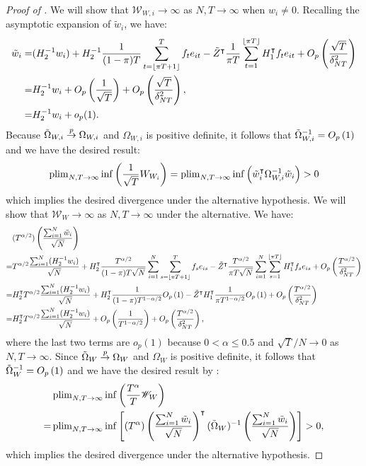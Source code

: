 \documentclass[12pt]{article}
\newcommand*{\tran}{\intercal}
\theoremstyle{plain}
\numberwithin{equation}{section}
\begin{document}
\begin{proof}[Proof of ]
We will show that $\mathscr{W}_{W, i} \to \infty$ as $N, T \to \infty$ when $w_i \neq 0$.
Recalling the asymptotic expansion of $\tilde{w}_i$, we have:
\begin{align*}
\tilde{w}_i = &(H_{2}^{-1} w_i) +
H_{2}^{-1} \frac{1}{(1 - \pi){T}} \sumTfloort f_t e_{it} - 
\tilde{Z}^\tran \frac{1}{\pi {T}} \sumTfloor H_1^\tran f_t e_{it} +
\OprtTdeltasq  \\
= &H_2^{-1} w_i + \OprtT + \OprtTdeltasq, \\
= &H_2^{-1} w_i + o_p(1).
\end{align*}
Because $\tilde{\Omega}_{W, i} \overset{p}{\to} \Omega_{W, i}$ and $\Omega_{W, i}$ is positive definite, it follows that $\tilde{\Omega}_{W, i}^{-1} = O_p \left( 1 \right)$ and we have the desired result:
\begin{align*}
\plimNT \inf \left( 
	\frac{1}{\sqrt{T}} W_{W_i}
\right) = \plimNT \inf \left( 
	\tilde{w}_i^\tran \Omega_{W, i}^{-1} \tilde{w}_i
\right) > 0
\end{align*}
which implies the desired divergence under the alternative hypothesis.
We will show that $\mathscr{W}_W \to \infty$ as $N, T \to \infty$ under the alternative. We have:
\begin{align*}
&(T^{\alpha / 2}) \left( \frac{\sumN \tilde{w}_i}{\sqrt{N}}\right) \\
= &T^{\alpha / 2} \frac{\sumN (H_{2}^{-1} w_i)}{\sqrt{N}} + 
H_{2}^\tran \frac{T^{\alpha / 2}}{(1 - \pi) T \sqrt{N}} \sumN \sumTfloorts f_s e_{is} - 
\tilde{Z}^\tran \frac{T^{\alpha / 2}}{\pi T \sqrt{N}} \sumN \sumTfloors H_1^\tran f_s e_{is} +
\Op{\frac{T^{\alpha/2}}{\delta_{NT}^2}}
\\
= &H_2^\tran T^{\alpha / 2} \frac{\sumN (H_{2}^{-1} w_i)}{\sqrt{N}} + H_{2}^\tran \frac{1}{(1 - \pi)T^{1 - \alpha/2}} \Op{1} - 
\tilde{Z}^\tran H_1^\tran \frac{1}{\pi T^{1 - \alpha/2}} \Op{1} +
\Op{\frac{T^{\alpha/2}}{\delta_{NT}^2}} \\
= &H_2^\tran T^{\alpha / 2} \frac{\sumN (H_{2}^{-1} w_i)}{\sqrt{N}} + \Op{\frac{1}{T^{1 - \alpha/2}}} + \Op{\frac{T^{\alpha/2}}{\delta_{NT}^2}},
\end{align*}
where the last two terms are $o_p(1)$ because $0 < \alpha \leq 0.5$ and $\sqrt{T}/N \to 0$ as $N, T \to \infty$. Since $\tilde{\Omega}_W \overset{p}{\to} \Omega_W$ and $\Omega_W$ is positive definite, it follows that $\tilde{\Omega}_W^{-1} = O_p \left( 1 \right)$ and we have the desired result by :
\begin{align*}
&\plimNT \inf \left( \frac{T^{\alpha}}{T} \mathscr{W}_W \right) \\
= &\plimNT \inf \left[ 
	(T^{\alpha}) \left( \frac{\sumN \tilde{w}_i}{\sqrt{N}}\right)^\tran (\tilde{\Omega}_{W})^{-1} \left( \frac{\sumN \tilde{w}_i}{\sqrt{N}}\right)
\right] > 0,
\end{align*}
which implies the desired divergence under the alternative hypothesis.
\end{proof}
\end{document}
